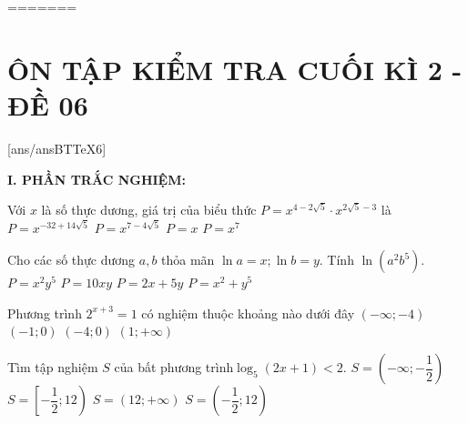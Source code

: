=======
\section*{ÔN TẬP KIỂM TRA CUỐI KÌ 2 - ĐỀ 06}
\setcounter{ex}{0}\setcounter{bt}{0}
[ans/ansBTTeX6]

\noindent\textbf{I. PHẦN TRẮC NGHIỆM:}
\begin{ex}
Với $x$ là số thực dương, giá trị của biểu thức $P={x^{4-2\sqrt{5}}} \cdot {x^{2\sqrt{5}-3}}$ là
\choice
{$P={x^{-32+14\sqrt{5}}}$}
{$P={x^{7-4\sqrt{5}}}$}
{\True $P=x$}
{$P=x^7$}
\end{ex}
\begin{ex}
Cho các số thực dương $a,b$ thỏa mãn $\ln a=x;\ln b=y$. Tính $\ln \left(a^2b^5\right)$.
\choice
{$P=x^2y^5$}
{$P=10xy$}
{\True $P=2x+5y$}
{$P=x^2+y^5$}
\end{ex}
\begin{ex}
\end{ex}
\begin{ex}
Phương trình ${2^{x+3}}=1$ có nghiệm thuộc khoảng nào dưới đây
\choice
{$\left(-\infty ;-4\right)$}
{$(-1;0)$}
{\True $(-4;0)$}
{$\left(1;+\infty\right)$}
\end{ex}
\begin{ex}
Tìm tập nghiệm $S$ của bất phương trình$\log _5(2x+1)<2$.
\choice
{$S=\left(-\infty ;-\dfrac{1}{2}\right)$}
{$S=\left[-\dfrac{1}{2};12\right)$}
{$S=\left(12;+\infty\right)$}
{\True $S=\left(-\dfrac{1}{2};12\right)$}
\end{ex}

